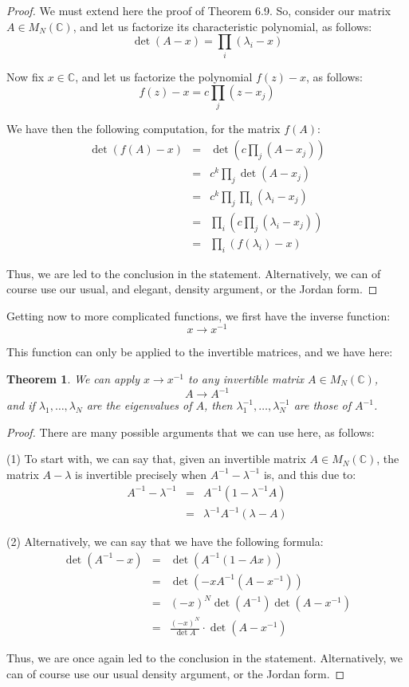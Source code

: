 \documentclass[12pt]{amsbook}
\newtheorem{theorem}{Theorem}[chapter]
\begin{document}
\begin{proof}
We must extend here the proof of Theorem 6.9. So, consider our matrix $A\in M_N(\mathbb C)$, and let us factorize its characteristic polynomial, as follows:
$$\det(A-x)=\prod_i(\lambda_i-x)$$

Now fix $x\in\mathbb C$, and let us factorize the polynomial $f(z)-x$, as follows:
$$f(z)-x=c\prod_j(z-x_j)$$

We have then the following computation, for the matrix $f(A)$:
\begin{eqnarray*}
\det(f(A)-x)
&=&\det\left(c\prod_j(A-x_j)\right)\\
&=&c^k\prod_j\det(A-x_j)\\
&=&c^k\prod_j\prod_i(\lambda_i-x_j)\\
&=&\prod_i\left(c\prod_j(\lambda_i-x_j)\right)\\
&=&\prod_i(f(\lambda_i)-x)
\end{eqnarray*}

Thus, we are led to the conclusion in the statement. Alternatively, we can of course use our usual, and elegant, density argument, or the Jordan form.
\end{proof}

Getting now to more complicated functions, we first have the inverse function:
$$x\to x^{-1}$$

This function can only be applied to the invertible matrices, and we have here:

\begin{theorem}
We can apply $x\to x^{-1}$ to any invertible matrix $A\in M_N(\mathbb C)$, 
$$A\to A^{-1}$$
and if $\lambda_1,\ldots,\lambda_N$ are the eigenvalues of $A$, then $\lambda_1^{-1},\ldots,\lambda_N^{-1}$ are those of $A^{-1}$.
\end{theorem}

\begin{proof}
There are many possible arguments that we can use here, as follows:

\medskip

(1) To start with, we can say that, given an invertible matrix $A\in M_N(\mathbb C)$, the matrix $A-\lambda$ is invertible precisely when $A^{-1}-\lambda^{-1}$ is, and this due to:
\begin{eqnarray*}
A^{-1}-\lambda^{-1}
&=&A^{-1}(1-\lambda^{-1}A)\\
&=&\lambda^{-1}A^{-1}(\lambda-A)
\end{eqnarray*}

(2) Alternatively, we can say that we have the following formula:
\begin{eqnarray*}
\det(A^{-1}-x)
&=&\det(A^{-1}(1-Ax))\\
&=&\det(-xA^{-1}(A-x^{-1}))\\
&=&(-x)^N\det(A^{-1})\det(A-x^{-1})\\
&=&\frac{(-x)^N}{\det A}\cdot\det(A-x^{-1}) 
\end{eqnarray*}

Thus, we are once again led to the conclusion in the statement.  Alternatively, we can of course use our usual density argument, or the Jordan form.
\end{proof}
\end{document}
